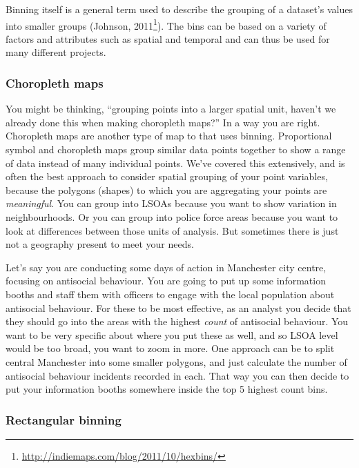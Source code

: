\documentclass[
]{book}
\renewcommand{\href}[2]{#2\footnote{\url{#1}}}
\begin{document}
Binning itself is a general term used to describe the grouping of a dataset's values into smaller groups (\href{http://indiemaps.com/blog/2011/10/hexbins/}{Johnson, 2011}). The bins can be based on a variety of factors and attributes such as spatial and temporal and can thus be used for many different projects.

\hypertarget{choropleth-maps-1}{%
\subsubsection{Choropleth maps}\label{choropleth-maps-1}}

You might be thinking, ``grouping points into a larger spatial unit, haven't we already done this when making choropleth maps?'' In a way you are right. Choropleth maps are another type of map to that uses binning. Proportional symbol and choropleth maps group similar data points together to show a range of data instead of many individual points. We've covered this extensively, and is often the best approach to consider spatial grouping of your point variables, because the polygons (shapes) to which you are aggregating your points are \emph{meaningful}. You can group into LSOAs because you want to show variation in neighbourhoods. Or you can group into police force areas because you want to look at differences between those units of analysis. But sometimes there is just not a geography present to meet your needs.

Let's say you are conducting some days of action in Manchester city centre, focusing on antisocial behaviour. You are going to put up some information booths and staff them with officers to engage with the local population about antisocial behaviour. For these to be most effective, as an analyst you decide that they should go into the areas with the highest \emph{count} of antisocial behaviour. You want to be very specific about where you put these as well, and so LSOA level would be too broad, you want to zoom in more. One approach can be to split central Manchester into some smaller polygons, and just calculate the number of antisocial behaviour incidents recorded in each. That way you can then decide to put your information booths somewhere inside the top 5 highest count bins.

\hypertarget{rectangular-binning}{%
\subsubsection{Rectangular binning}\label{rectangular-binning}}
\end{document}
